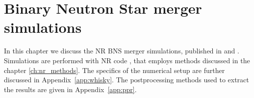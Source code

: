 \chapter{Binary Neutron Star merger simulations} \label{ch:bns_sims}

In this chapter we discuss the \ac{NR} \ac{BNS} merger simulations,
published in \citet{Nedora:2019jhl} and \citet{Nedora:2020pak}.
%
Simulations are performed with \ac{NR} code \wisky{}, that employs 
methods discussed in the chapter \ref{ch:nr_methods}. The specifics 
of the numerical setup are further discussed in Appendix~\ref{app:whisky}.
The postprocessing methods used to extract the results are 
given in Appendix~\ref{app:ppr}.
%













